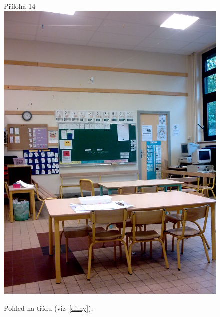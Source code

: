 	\begin{figure}[tb]
		\centering
		Příloha 14\\
		\includegraphics[height=0.35\textheight]{./fotky/Obr14.jpg}
		\caption{
			Pohled na třídu (viz~\ref{dilny}).
		}
		\label{Obr14}
	\end{figure}

